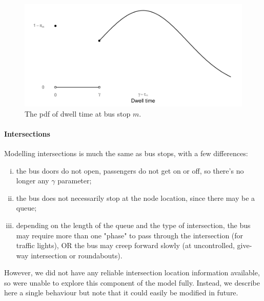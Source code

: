 \begin{knitrout}\small
{}\color{fgcolor}\begin{figure}

{\centering \includegraphics[width=.8\textwidth]{figure/eta_dwell_times-1} 

}

\caption[The \gls{pdf} of dwell time at a stop]{The \gls{pdf} of dwell time at bus stop $m$.}\label{fig:eta_dwell_times}
\end{figure}


\end{knitrout}



\paragraph{Intersections}

Modelling intersections is much the same as bus stops, with a few differences:
\begin{enumerate}[i.]
\item the bus doors do not open, passengers do not get on or off, so there's no longer any $\gamma$ parameter;
\item the bus does not necessarily stop at the node location, since there may be a queue;
\item depending on the length of the queue and the type of intersection, the bus may require more than one "phase" to pass through the intersection (for traffic lights), OR the bus may creep forward slowly (at uncontrolled, give-way intersection or roundabouts).
\end{enumerate}

However, we did not have any reliable intersection location information available, so were unable to explore this component of the model fully. Instead, we describe here a single behaviour but note that it could easily be modified in future.

